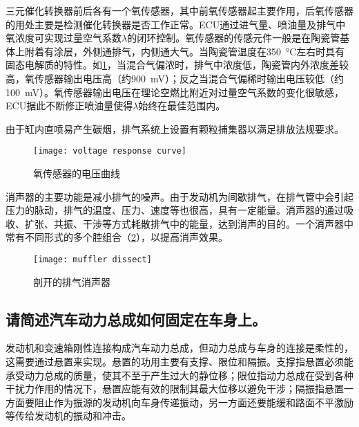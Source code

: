 \documentclass[UTF8]{ctexart}
\numberwithin{figure}{section}
\numberwithin{table}{section}
\begin{document}
三元催化转换器前后各有一个氧传感器，其中前氧传感器起主要作用，后氧传感器的用处主要是检测催化转换器是否工作正常。ECU通过进气量、喷油量及排气中氧浓度可实现过量空气系数$\lambda$的闭环控制。氧传感器的传感元件一般是在陶瓷管基体上附着有涂层，外侧通排气，内侧通大气。当陶瓷管温度在\SI{350}{\celsius}左右时具有固态电解质的特性。如\cref{voltage response curve}，当混合气偏浓时，排气中浓度低，陶瓷管内外浓度差较高，氧传感器输出电压高（约\SI{900}{\mV}）；反之当混合气偏稀时输出电压较低（约\SI{100}{\mV}）。氧传感器输出电压在理论空燃比附近对过量空气系数的变化很敏感，ECU据此不断修正喷油量使得$\lambda$始终在最佳范围内。

由于缸内直喷易产生碳烟，排气系统上设置有颗粒捕集器以满足排放法规要求。

\begin{figure}[htbp]
	\centering
	\begin{minipage}[b]{0.45\textwidth}
		\centering
		\texttt{[image: voltage response curve]}
		\caption{氧传感器的电压曲线}
		\label{voltage response curve}
	\end{minipage}
\end{figure}

消声器的主要功能是减小排气的噪声。由于发动机为间歇排气，在排气管中会引起压力的脉动，排气的温度、压力、速度等也很高，具有一定能量。消声器的通过吸收、扩张、共振、干涉等方式耗散排气中的能量，达到消声的目的。一个消声器中常有不同形式的多个腔组合（\cref{muffler dissect}），以提高消声效果。

\begin{figure}[htbp]
	\centering
	\begin{minipage}[b]{0.6\textwidth}
		\centering
		\texttt{[image: muffler dissect]}
		\caption{剖开的排气消声器}
		\label{muffler dissect}
	\end{minipage}
\end{figure}

\subsection{请简述汽车动力总成如何固定在车身上。}

发动机和变速箱刚性连接构成汽车动力总成，但动力总成与车身的连接是柔性的，这需要通过悬置来实现。悬置的功用主要有支撑、限位和隔振。支撑指悬置必须能承受动力总成的质量，使其不至于产生过大的静位移；限位指动力总成在受到各种干扰力作用的情况下，悬置应能有效的限制其最大位移以避免干涉；隔振指悬置一方面要阻止作为振源的发动机向车身传递振动，另一方面还要能缓和路面不平激励等传给发动机的振动和冲击。
\end{document}
